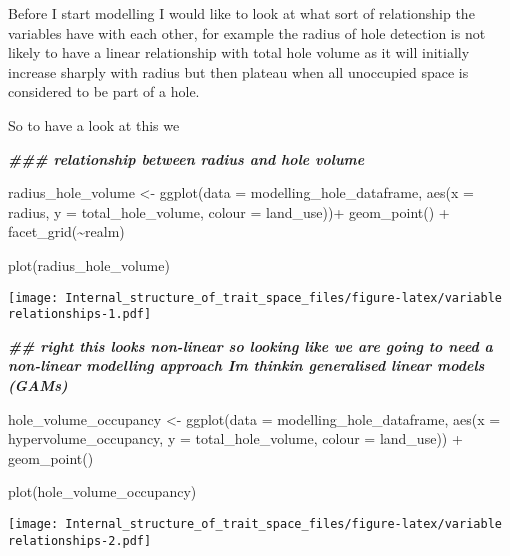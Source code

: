 \documentclass[
]{article}
\newenvironment{Shaded}{\begin{snugshade}}{\end{snugshade}}
\newcommand{\AttributeTok}[1]{\textcolor[rgb]{0.77,0.63,0.00}{#1}}
\newcommand{\DocumentationTok}[1]{\textcolor[rgb]{0.56,0.35,0.01}{\textbf{\textit{#1}}}}
\newcommand{\FunctionTok}[1]{\textcolor[rgb]{0.00,0.00,0.00}{#1}}
\newcommand{\NormalTok}[1]{#1}
\newcommand{\OtherTok}[1]{\textcolor[rgb]{0.56,0.35,0.01}{#1}}
\newcommand{\SpecialCharTok}[1]{\textcolor[rgb]{0.00,0.00,0.00}{#1}}
\begin{document}
Before I start modelling I would like to look at what sort of
relationship the variables have with each other, for example the radius
of hole detection is not likely to have a linear relationship with total
hole volume as it will initially increase sharply with radius but then
plateau when all unoccupied space is considered to be part of a hole.

So to have a look at this we

\begin{Shaded}
\begin{Highlighting}[]
\DocumentationTok{\#\#\# relationship between radius and hole volume }


\NormalTok{radius\_hole\_volume }\OtherTok{\textless{}{-}} \FunctionTok{ggplot}\NormalTok{(}\AttributeTok{data =}\NormalTok{ modelling\_hole\_dataframe, }\FunctionTok{aes}\NormalTok{(}\AttributeTok{x =}\NormalTok{ radius, }\AttributeTok{y =}\NormalTok{ total\_hole\_volume, }\AttributeTok{colour =}\NormalTok{ land\_use))}\SpecialCharTok{+}
  \FunctionTok{geom\_point}\NormalTok{() }\SpecialCharTok{+}
  \FunctionTok{facet\_grid}\NormalTok{(}\SpecialCharTok{\textasciitilde{}}\NormalTok{realm)}


\FunctionTok{plot}\NormalTok{(radius\_hole\_volume)}
\end{Highlighting}
\end{Shaded}

\texttt{[image: Internal\_structure\_of\_trait\_space\_files/figure-latex/variable relationships-1.pdf]}

\begin{Shaded}
\begin{Highlighting}[]
\DocumentationTok{\#\# right this looks non{-}linear so looking like we are going to need a non{-}linear modelling approach I\textquotesingle{}m thinkin generalised linear models (GAMs)}


\NormalTok{hole\_volume\_occupancy }\OtherTok{\textless{}{-}} \FunctionTok{ggplot}\NormalTok{(}\AttributeTok{data =}\NormalTok{ modelling\_hole\_dataframe, }\FunctionTok{aes}\NormalTok{(}\AttributeTok{x =}\NormalTok{ hypervolume\_occupancy, }\AttributeTok{y =}\NormalTok{ total\_hole\_volume, }\AttributeTok{colour =}\NormalTok{ land\_use)) }\SpecialCharTok{+}
  \FunctionTok{geom\_point}\NormalTok{()}


\FunctionTok{plot}\NormalTok{(hole\_volume\_occupancy)}
\end{Highlighting}
\end{Shaded}

\texttt{[image: Internal\_structure\_of\_trait\_space\_files/figure-latex/variable relationships-2.pdf]}
\end{document}
